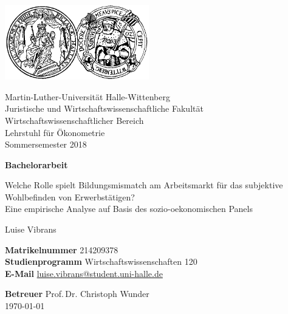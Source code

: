 \thispagestyle{empty}

\begin{titlepage}
\centering
\includegraphics[width=0.47\textwidth]{logo} \vspace{5pt}

\begin{large}
Martin-Luther-Universität Halle-Wittenberg \\ 
Juristische und Wirtschaftswissenschaftliche Fakultät \\ 
Wirtschaftswissenschaftlicher Bereich \\ 
Lehrstuhl für Ökonometrie \\
Sommersemester 2018 \\
\end{large}

\vspace{75pt}



{\Large\bfseries Bachelorarbeit} \vspace{15pt}

{\LARGE Welche Rolle spielt Bildungsmismatch am Arbeitsmarkt für das subjektive Wohlbefinden von Erwerbstätigen? \\Eine empirische Analyse auf Basis des sozio-oekonomischen Panels} 

\vspace{25pt}

{\Large Luise Vibrans \par}
{\large {\bfseries Matrikelnummer} 214209378}\\
{\large {\bfseries Studienprogramm} Wirtschaftswissenschaften 120}\\
{\large {\bfseries E-Mail} \href{mailto:luise.vibrans@student.uni-halle.de}{luise.vibrans@student.uni-halle.de}}\\

\vspace{40pt}

{\large {\bfseries Betreuer} Prof.\,Dr. Christoph Wunder}\\


\vfill
{\Large \today}

\end{titlepage}